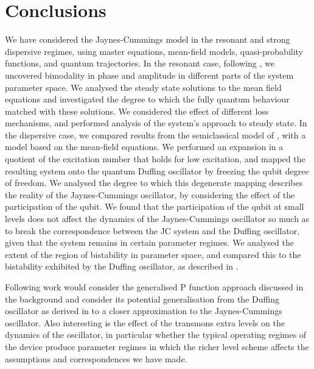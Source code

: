 \section{Conclusions}
We have considered the Jaynes-Cummings model in the resonant and strong dispersive regimes, using master equations, mean-field models, quasi-probability functions, and quantum trajectories. 
In the resonant case, following \cite{Carmichael2015}, we uncovered bimodality in phase and amplitude in different parts of the system parameter space. 
We analysed the steady state solutions to the mean field equations and investigated the degree to which the fully quantum behaviour matched with these solutions. 
We considered the effect of different loss mechanisms, and performed analysis of the system's approach to steady state. 
In the dispersive case, we compared results from the semiclassical model of \cite{Bishop2010}, with a model based on the mean-field equations. 
We performed an expansion in a quotient of the excitation number that holds for low excitation, and mapped the resulting system onto the quantum Duffing oscillator by freezing the qubit degree of freedom.
We analysed the degree to which this degenerate mapping describes the reality of the Jaynes-Cummings oscillator, by considering the effect of the participation of the qubit. 
We found that the participation of the qubit at small levels does not affect the dynamics of the Jaynes-Cummings oscillator so much as to break the correspondence between the JC system and the Duffing oscillator, given that the system remains in certain parameter regimes.
We analysed the extent of the region of bistability in parameter space, and compared this to the bistability exhibited by the Duffing oscillator, as described in \cite{Drummond1979}.

Following work would consider the generalised P function approach discussed in the background and consider its potential generalisation from the Duffing oscillator as derived in \cite{Drummond1979} to a closer approximation to the Jaynes-Cummings oscillator. 
Also interesting is the effect of the transmons extra levels on the dynamics of the oscillator, in particular whether the typical operating regimes of the device produce parameter regimes in which the richer level scheme affects the assumptions and correspondences we have made. 
